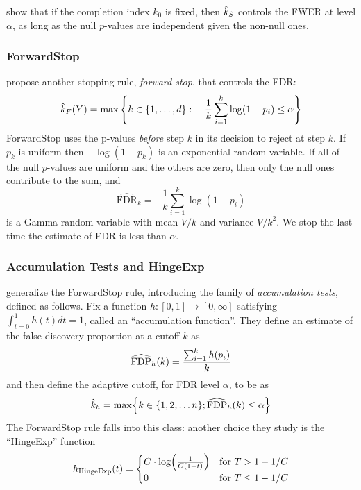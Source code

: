 \documentclass{article}
\begin{document}
\citet{gsell2013sequential} show that if the completion index $k_0$ is fixed, then $\hat{k}_S$ controls the FWER at level $\alpha$, as long as the null $p$-values are independent given the non-null ones.

\subsubsection{ForwardStop}

\citet{gsell2013sequential} propose another stopping rule, {\em forward stop}, that controls the FDR:
\[
  \hat{k}_{F}(Y) = \max\left\{k \in \{1,\ldots,d\} :\;
    -\frac{1}{k}\sum_{i=1}^k \log(1-p_i) \leq \alpha\right\}
\]
ForwardStop uses the p-values {\it before} step $k$ in its decision to reject at step $k$. 
If $p_k$ is uniform then  $-\log(1-p_k)$ is an exponential random variable. If all of the null $p$-values are uniform and the others are zero, then only the null ones contribute to the sum, and
\[
\widehat{\text{FDR}}_k = -\frac{1}{k}\sum_{i=1}^k \log(1-p_i)
\]
is a Gamma random variable with mean $V/k$ and variance $V/k^2$. We stop the last time the estimate of FDR is less than $\alpha$. 

\subsubsection{Accumulation Tests and HingeExp}

\citet{li2015accumulation} generalize the ForwardStop rule, introducing the family of {\em accumulation tests}, defined as follows.
Fix a function $h: [0,1] \rightarrow [0,\infty]$ satisfying $\int _{t=0}^1 h(t)dt=1$, called an ``accumulation function''. They define an estimate of the
false discovery proportion at a cutoff $k$ as
\begin{equation}
\widehat{\rm FDP}_h(k)= \frac{\sum_{i=1}^k h(p_i)}{k}
\end{equation}
and then define the adaptive cutoff,  for FDR level $\alpha$, to be                                                                                                                 as
\begin{equation}
\hat k_h={\rm max} \Bigl\{k\in \{1,2,\ldots n\}; \widehat{\rm FDP}_h(k) \leq \alpha \Bigr\}
\end{equation}
The ForwardStop rule falls into this class:  another  choice they study is the ``HingeExp'' function
\begin{equation}
h_{\rm HingeExp}(t)= 
\begin{cases} C\cdot\log\Bigl(\frac{1}{C(1-t)} \Bigr)& \text{for $T> 1-1/C$}\\
                         0                                         & \text{for $T\leq 1-1/C$}
                         \end{cases}
 \end{equation}
 
\end{document}

